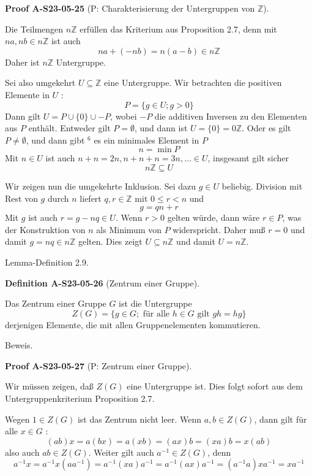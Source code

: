 \documentclass[10pt, letterpaper]{article}
\newcommand{\CustomHeading}[3]{%
  \par\medskip\noindent%
  \textbf{#1 #2} \textnormal{(#3)}.\enskip%
}
\newenvironment{DEF}[2]{\begin{unitbox}\CustomHeading{Definition}{#1}{#2}}{\end{unitbox}}
\newenvironment{PROOF}[2]{\begin{unitbox}\CustomHeading{Proof}{#1}{#2}}{\end{unitbox}}
\begin{document}
\begin{PROOF}{A-S23-05-25}{P: Charakterisierung der Untergruppen von $\mathbb{Z}$}
Die Teilmengen $n \mathbb{Z}$ erfüllen das Kriterium aus Proposition 2.7, denn mit $n a, n b \in n \mathbb{Z}$ ist auch
$$
n a+(-n b)=n(a-b) \in n \mathbb{Z}
$$
Daher ist $n \mathbb{Z}$ Untergruppe.

Sei also umgekehrt $U \subseteq \mathbb{Z}$ eine Untergruppe. Wir betrachten die positiven Elemente in $U$ :
$$
P=\{g \in U ; g>0\}
$$
Dann gilt $U=P \cup\{0\} \cup-P$, wobei $-P$ die additiven Inversen zu den Elementen aus $P$ enthält. Entweder gilt $P=\emptyset$, und dann ist $U=\{0\}=0 \mathbb{Z}$. Oder es gilt $P \neq \emptyset$, und dann gibt ${ }^{6}$ es ein minimales Element in $P$
$$
n=\min P
$$
Mit $n \in U$ ist auch $n+n=2 n, n+n+n=3 n, \ldots \in U$, insgesamt gilt sicher
$$
n \mathbb{Z} \subseteq U
$$

Wir zeigen nun die umgekehrte Inklusion. Sei dazu $g \in U$ beliebig. Division mit Rest von $g$ durch $n$ liefert $q, r \in \mathbb{Z}$ mit $0 \leq r<n$ und
$$
g=q n+r
$$
Mit $g$ ist auch $r=g-n q \in U$. Wenn $r>0$ gelten würde, dann wäre $r \in P$, was der Konstruktion von $n$ als Minimum von $P$ widerspricht. Daher muß $r=0$ und damit $g=n q \in n \mathbb{Z}$ gelten. Dies zeigt $U \subseteq n \mathbb{Z}$ und damit $U=n \mathbb{Z}$.
\end{PROOF}



Lemma-Definition 2.9. 


\begin{DEF}{A-S23-05-26}{Zentrum einer Gruppe}
Das Zentrum einer Gruppe $G$ ist die Untergruppe
$$
Z(G)=\{g \in G ; \text { für alle } h \in G \text { gilt } g h=h g\}
$$
derjenigen Elemente, die mit allen Gruppenelementen kommutieren.
\end{DEF}


Beweis. 

\begin{PROOF}{A-S23-05-27}{P: Zentrum einer Gruppe}
Wir müssen zeigen, daß $Z(G)$ eine Untergruppe ist. Dies folgt sofort aus dem Untergruppenkriterium Proposition 2.7.

Wegen $1 \in Z(G)$ ist das Zentrum nicht leer. Wenn $a, b \in Z(G)$, dann gilt für alle $x \in G$ :
$$
(a b) x=a(b x)=a(x b)=(a x) b=(x a) b=x(a b)
$$
also auch $a b \in Z(G)$. Weiter gilt auch $a^{-1} \in Z(G)$, denn
$$
a^{-1} x=a^{-1} x\left(a a^{-1}\right)=a^{-1}(x a) a^{-1}=a^{-1}(a x) a^{-1}=\left(a^{-1} a\right) x a^{-1}=x a^{-1}
$$
\end{PROOF}
\end{document}
